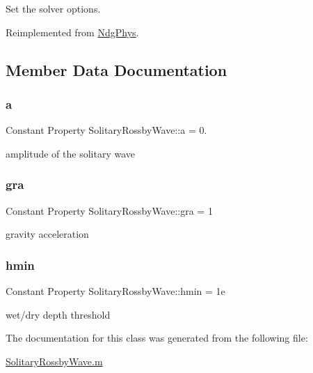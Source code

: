 Set the solver options. 



Reimplemented from \hyperlink{class_ndg_phys_a5cd323275f4098db166471c4b078ed17}{Ndg\+Phys}.



\subsection{Member Data Documentation}
\mbox{\label{class_solitary_rossby_wave_a837c57dee92d4833d927352b2dca6790}} 
\subsubsection{\texorpdfstring{a}{a}}
{\footnotesize\ttfamily Constant Property Solitary\+Rossby\+Wave\+::a = 0.}



amplitude of the solitary wave 

\mbox{\label{class_solitary_rossby_wave_a546459aa28281ca935b4b72d479df810}} 
\subsubsection{\texorpdfstring{gra}{gra}}
{\footnotesize\ttfamily Constant Property Solitary\+Rossby\+Wave\+::gra = 1}



gravity acceleration 

\mbox{\label{class_solitary_rossby_wave_a83d04b904067cea3cf2d9a29c8c2cfdd}} 
\subsubsection{\texorpdfstring{hmin}{hmin}}
{\footnotesize\ttfamily Constant Property Solitary\+Rossby\+Wave\+::hmin = 1e}



wet/dry depth threshold 



The documentation for this class was generated from the following file\+:\begin{DoxyCompactItemize}
\item 
\hyperlink{_solitary_rossby_wave_8m}{Solitary\+Rossby\+Wave.\+m}\end{DoxyCompactItemize}
